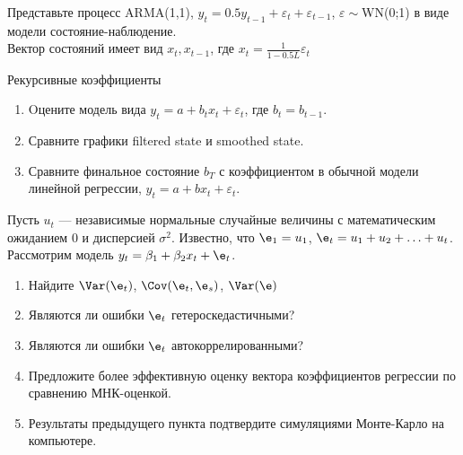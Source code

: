 \begin{solution}
\end{solution}

\begin{problem}
Представьте процесс ARMA(1,1),
$y_{t}=0.5y_{t-1}+\varepsilon_{t}+\varepsilon_{t-1}$,
$\varepsilon\sim$WN(0;1) в
виде модели состояние-наблюдение. \\
Вектор состояний имеет вид $x_{t},x_{t-1}$, где
$x_{t}=\frac{1}{1-0.5L}\varepsilon_{t}$ 
\end{problem}

\begin{solution}
\end{solution}


\begin{problem}
Рекурсивные коэффициенты 
\begin{enumerate}
\item Oцените модель вида $y_{t}=a+b_{t}x_{t}+\varepsilon_{t}$,
где $b_{t}=b_{t-1}$. 
\item Сравните графики filtered state и smoothed state. 
\item Сравните финальное состояние $b_{T}$ с коэффициентом в
обычной модели линейной регрессии, $y_{t}=a+bx_{t}+\varepsilon_{t}$. 
\end{enumerate}
\end{problem}

\begin{solution}
\end{solution}


\begin{problem}
Пусть $u_t$ --- независимые нормальные случайные величины с 
математическим ожиданием $0$ и дисперсией $\sigma^2$. Известно, что $\e_1=u_1$, $\e_t=u_1+u_2+\ldots+u_t$. Рассмотрим модель $y_t=\beta_1+\beta_2 x_t + \e_t$.

\begin{enumerate}
\item Найдите $\Var(\e_t)$, $\Cov(\e_t,\e_s)$, $\Var(\e)$
\item Являются ли ошибки $\e_t$ гетероскедастичными?
\item Являются ли ошибки $\e_t$ автокоррелированными?
\item Предложите более эффективную оценку вектора коэффициентов регрессии по сравнению МНК-оценкой.
\item Результаты предыдущего пункта подтвердите симуляциями Монте-Карло на компьютере.
\end{enumerate}
\end{problem}

